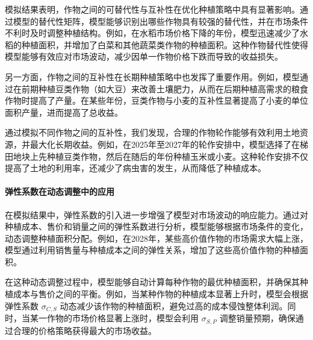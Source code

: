 \documentclass[12pt,a4paper]{nmmcm}
\begin{document}
模拟结果表明，作物之间的可替代性与互补性在优化种植策略中具有显著影响。通过模型的替代性矩阵，模型能够识别出哪些作物具有较强的替代性，并在市场条件不利时及时调整种植结构。例如，在水稻市场价格下降的年份，模型迅速减少了水稻的种植面积，并增加了白菜和其他蔬菜类作物的种植面积。这种作物替代性使得模型能够有效应对市场波动，减少因单一作物价格下跌而导致的收益损失。

另一方面，作物之间的互补性在长期种植策略中也发挥了重要作用。例如，模型通过在前期种植豆类作物（如大豆）来改善土壤肥力，从而在后期种植高需求的粮食作物时提高了产量。在某些年份，豆类作物与小麦的互补性显著提高了小麦的单位面积产量，进而提高了总收益。

通过模拟不同作物之间的互补性，我们发现，合理的作物轮作能够有效利用土地资源，并最大化长期收益。例如，在2025年至2027年的轮作安排中，模型选择了在梯田地块上先种植豆类作物，然后在随后的年份种植玉米或小麦。这种轮作安排不仅提高了土地的利用率，还减少了病虫害的发生，从而降低了种植成本。

\paragraph{弹性系数在动态调整中的应用}

在模拟结果中，弹性系数的引入进一步增强了模型对市场波动的响应能力。通过对种植成本、售价和销量之间的弹性系数进行分析，模型能够根据市场条件的变化，动态调整种植面积分配。例如，在2028年，某些高价值作物的市场需求大幅上涨，模型通过利用销售量与种植成本之间的弹性关系，增加了这些高价值作物的种植面积。

在这种动态调整过程中，模型能够自动计算每种作物的最优种植面积，并确保其种植成本与售价之间的平衡。例如，当某种作物的种植成本显著上升时，模型会根据弹性系数 $\sigma_{C,S}$ 动态减少该作物的种植面积，避免过高的成本侵蚀整体利润。同时，当某一作物的市场价格显著上涨时，模型会利用 $\sigma_{S,P}$ 调整销量预期，确保通过合理的价格策略获得最大的市场收益。














\newpage

\nocite{*}
\printbibliography
\end{document}
